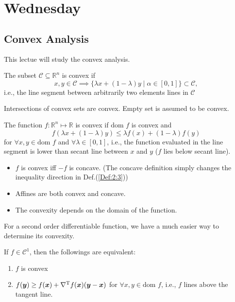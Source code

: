 

\section{Wednesday}
\subsection{Convex Analysis}
This lectue will study the convex analysis.

\begin{definition}[Convex]
The subset $\mathcal{C}\subseteq\mathbb{R}^n$ is convex if
\[
x,y\in\mathcal{C}\implies
\{\lambda x + (1-\lambda)y\mid \alpha\in[0,1]\}\subset\mathcal{C},
\]
i.e., the line segment between arbitrarily two elements lines in $\mathcal{C}$
\end{definition}
\begin{remark}
Intersections of convex sets are convex. Empty set is assumed to be convex.
\end{remark}
\begin{definition}[Convex]\label{Def:2:3}
The function $f:\mathbb{R}^n\mapsto\mathbb{R}$ is convex if $\mbox{dom }f$ is convex and
\[
f(\lambda x+ (1-\lambda)y)\le\lambda f(x) + (1-\lambda) f(y)
\]
for $\forall x,y\in\mbox{dom }f$ and $\forall \lambda\in[0,1]$, i.e., the function evaluated in the line segment is lower than secant line between $x$ and $y$ ($f$ lies below secant line).
\end{definition}
\begin{remark}
\begin{itemize}
\item
$f$ is convex iff $-f$ is concave. (The concave definition simply changes the inequality direction in Def.(\ref{Def:2:3}))
\item
Affines are both convex and concave.
\item
The convexity depends on the domain of the function.
\end{itemize}
\end{remark}
For a second order differentiable function, we have a much easier way to determine its convexity.
\clearpage
\begin{theorem}\label{The:2:1}
If $f\in\mathcal{C}^1$, then the followings are equivalent:
\begin{enumerate}
\item
$f$ is convex
\item
$f(\bm y)\ge f(\bm x)+\nabla^{\mathrm T} f(\bm x)(\bm y - \bm x)$ for $\forall x,y\in\mbox{dom }f$, i.e., $f$ lines above the tangent line.
\end{enumerate}
\end{theorem}
